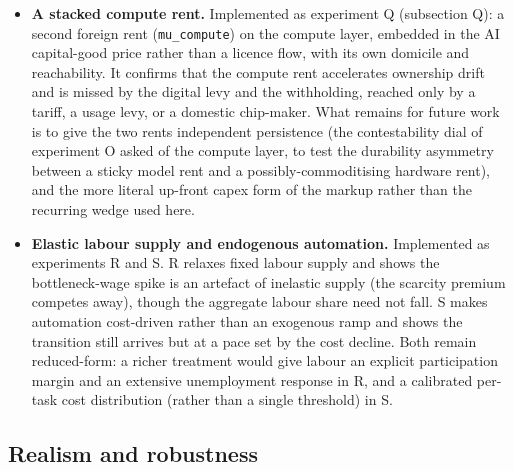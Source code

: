 \documentclass[12pt]{article}
\begin{document}
\begin{itemize}
  than a calibrated value.
\item
  \textbf{A stacked compute rent.} Implemented as experiment Q
  (subsection Q): a second foreign rent (\texttt{mu\_compute}) on the
  compute layer, embedded in the AI capital-good price rather than a
  licence flow, with its own domicile and reachability. It confirms that
  the compute rent accelerates ownership drift and is missed by the
  digital levy and the withholding, reached only by a tariff, a usage
  levy, or a domestic chip-maker. What remains for future work is to give
  the two rents independent persistence (the contestability dial of
  experiment O asked of the compute layer, to test the durability
  asymmetry between a sticky model rent and a possibly-commoditising
  hardware rent), and the more literal up-front capex form of the markup
  rather than the recurring wedge used here.
\item
  \textbf{Elastic labour supply and endogenous automation.} Implemented
  as experiments R and S. R relaxes fixed labour supply and shows the
  bottleneck-wage spike is an artefact of inelastic supply (the
  scarcity premium competes away), though the aggregate labour share
  need not fall. S makes automation cost-driven rather than an exogenous
  ramp and shows the transition still arrives but at a pace set by the
  cost decline. Both remain reduced-form: a richer treatment would give
  labour an explicit participation margin and an extensive
  unemployment response in R, and a calibrated per-task cost
  distribution (rather than a single threshold) in S.
\end{itemize}

\hypertarget{realism-and-robustness}{%
\subsection{Realism and robustness}\label{realism-and-robustness}}
\end{document}
